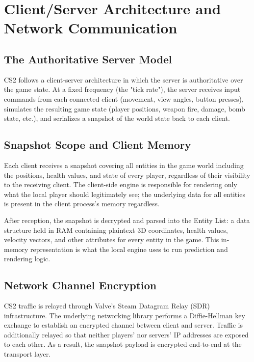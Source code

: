 \chapter{Client/Server Architecture and Network Communication}
\label{annexe:four}

\fancyhead[LE]{\textsc{\chaptername~\thechapter}}

\section{The Authoritative Server Model}

CS2 follows a client-server architecture in which the server is authoritative over the game state. At a fixed frequency (the "tick rate"), the server receives input commands from each connected client (movement, view angles, button presses), simulates the resulting game state (player positions, weapon fire, damage, bomb state, etc.), and serializes a snapshot of the world state back to each client.

\section{Snapshot Scope and Client Memory}

Each client receives a snapshot covering all entities in the game world including the positions, health values, and state of every player, regardless of their visibility to the receiving client. The client-side engine is responsible for rendering only what the local player should legitimately see; the underlying data for all entities is present in the client process's memory regardless.

After reception, the snapshot is decrypted and parsed into the Entity List: a data structure held in RAM containing plaintext 3D coordinates, health values, velocity vectors, and other attributes for every entity in the game. This in-memory representation is what the local engine uses to run prediction and rendering logic.

\section{Network Channel Encryption}

CS2 traffic is relayed through Valve's Steam Datagram Relay (SDR) infrastructure. The underlying networking library performs a Diffie-Hellman key exchange to establish an encrypted channel between client and server. Traffic is additionally relayed so that neither players' nor servers' IP addresses are exposed to each other. As a result, the snapshot payload is encrypted end-to-end at the transport layer.

